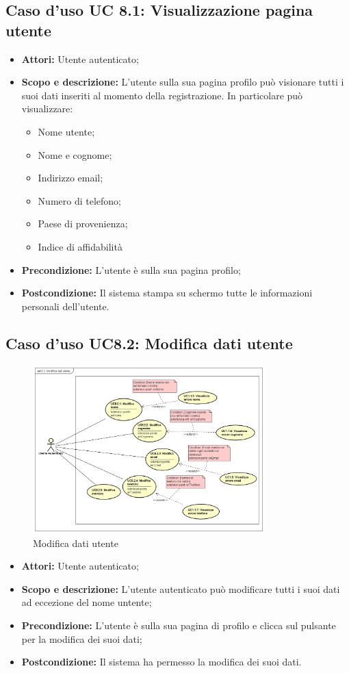 \documentclass[12pt,a4paper,titlepage]{article}
\begin{document}
\subsection{Caso d'uso UC 8.1: Visualizzazione pagina utente}
\begin{itemize}
	\item \textbf{Attori: }Utente autenticato;
	\item \textbf{Scopo e descrizione: }L'utente sulla sua pagina profilo può visionare tutti i suoi dati inseriti al momento della registrazione. In particolare può visualizzare:
	\begin{itemize}
		\item Nome utente;
		\item Nome e cognome;
		\item Indirizzo email;
		\item Numero di telefono;
		\item Paese di provenienza;
		\item Indice di affidabilità
	\end{itemize}
	\item \textbf{Precondizione: }L'utente è sulla sua pagina profilo;
	\item \textbf{Postcondizione: }Il sistema stampa su schermo tutte le informazioni personali dell'utente.
\end{itemize}
\subsection{Caso d'uso UC8.2: Modifica dati utente}
\begin{figure}[H]
	\centering
	\includegraphics[width=0.8\textwidth]{UseCase/ModificaDatiUtente}
	\caption{Modifica dati utente}
\end{figure}
\begin{itemize}
	\item \textbf{Attori: }Utente autenticato;
	\item \textbf{Scopo e descrizione: }L'utente autenticato può modificare tutti i suoi dati ad eccezione del nome untente;
	\item \textbf{Precondizione: }L'utente è sulla sua pagina di profilo e clicca sul pulsante per la modifica dei suoi dati;
	\item \textbf{Postcondizione: }Il sistema ha permesso la modifica dei suoi dati.
\end{itemize}
\end{document}
